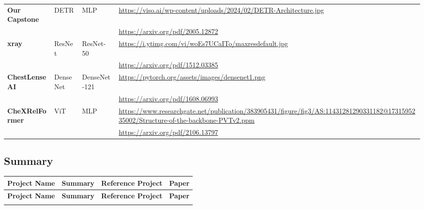 \documentclass[12pt, titlepage]{article}
\begin{document}
\begin{landscape}
\begin{longtable}{|l|l|l|p{10cm}|}
\textbf{Our Capstone}    & DETR                    & MLP                     & \url{https://viso.ai/wp-content/uploads/2024/02/DETR-Architecture.jpg} \\ 
                         &                         &                         & \url{https://arxiv.org/pdf/2005.12872} \\ \hline
\textbf{xray}           & ResNet                  & ResNet-50 \citep{resnet2015}              & \url{https://i.ytimg.com/vi/woEs7UCaITo/maxresdefault.jpg} \\ 
                         &                         &                         & \url{https://arxiv.org/pdf/1512.03385} \\ \hline
\textbf{ChestLenseAI}   & DenseNet                & DenseNet-121 \citep{densenet2017}           & \url{https://pytorch.org/assets/images/densenet1.png} \\ 
                         &                         &                         & \url{https://arxiv.org/pdf/1608.06993} \\ \hline
\textbf{CheXRelFormer}  & ViT                     & MLP \citep{vit2021}                    & \url{https://www.researchgate.net/publication/383905431/figure/fig3/AS:11431281290331182@1731595235002/Structure-of-the-backbone-PVTv2.ppm} \\ 
                         &                         &                         & \url{https://arxiv.org/pdf/2106.13797} \\ \hline

\end{longtable}

\newpage

\subsection{Summary}
\begin{longtable}{|l|p{10cm}|p{4cm}|p{4cm}|}
\hline
\textbf{Project Name}   & \textbf{Summary}                                                                 & \textbf{Reference Project}                              & \textbf{Paper}                                                \\ \hline
\endfirsthead
\hline
\textbf{Project Name}   & \textbf{Summary}                                                                 & \textbf{Reference Project}                              & \textbf{Paper}                                                \\ \hline
\endhead
\hline
\endfoot


\end{longtable}
\end{landscape}
\end{document}
